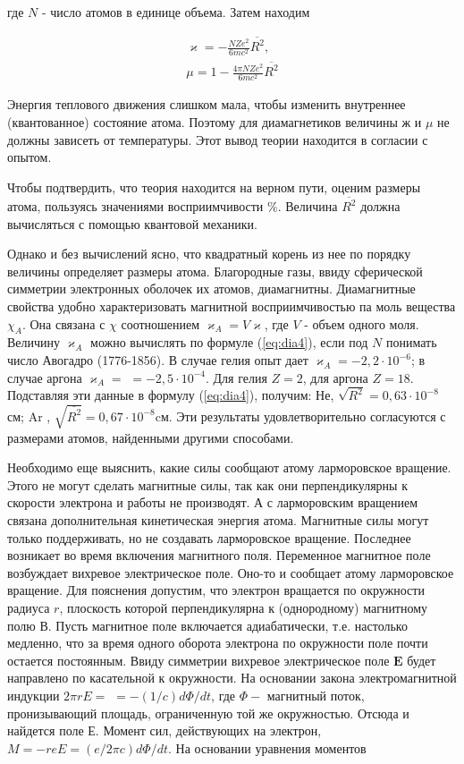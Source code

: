 \documentclass[12pt]{article}
\begin{document}
  где $N$ - число атомов в единице объема. Затем находим

  \begin{eqnarray}
  \varkappa=-\frac{N Z e^2}{6 m c^2} \overline{R^2}, \\
  \mu=1-\frac{4 \pi N Z e^2}{6 m c^2} \overline{R^2}
  \end{eqnarray}

  Энергия теплового движения слишком мала, чтобы изменить внутреннее (квантованное) состояние атома. Поэтому для диамагнетиков величины $ж$ и $\mu$ не должны зависеть от температуры. Этот вывод теории находится в согласии с опытом.

  Чтобы подтвердить, что теория находится на верном пути, оценим размеры атома, пользуясь значениями восприимчивости $\%$. Величина $\overline{R^2}$ должна вычисляться с помощью квантовой механики.

  Однако и без вычислений ясно, что квадратный корень из нее по порядку величины определяет размеры атома. Благородные газы, ввиду сферической симметрии электронных оболочек их атомов, диамагнитны. Диамагнитные свойства удобно характеризовать магнитной восприимчивостью па моль вещества $\chi_A$. Она связана с $\chi$ соотношением $\varkappa_A=V \varkappa$, где $V$ - объем одного моля. Величину $\varkappa_A$ можно вычислять по формуле (\ref{eq:dia4}), если под $N$ понимать число Авогадро (1776-1856). В случае гелия опыт дает $\varkappa_A=-2,2 \cdot 10^{-6}$; в случае аргона $\varkappa_A=$ $=-2,5 \cdot 10^{-4}$. Для гелия $Z=2$, для аргона $Z=18$. Подставляя
  эти данные в формулу (\ref{eq:dia4}), получим: Не, $\sqrt{R^2}=0,63 \cdot 10^{-8}$ см; Ar , $\sqrt{\overline{R^2}}=0,67 \cdot 10^{-8} \mathrm{cм}$. Эти результаты удовлетворительно согласуются с размерами атомов, найденными другими способами.

  Необходимо еще выяснить, какие силы сообщают атому ларморовское вращение. Этого не могут сделать магнитные силы, так как они перпендикулярны к скорости электрона и работы не производят. А с ларморовским вращением связана дополнительная кинетическая энергия атома. Магнитные силы могут только поддерживать, но не создавать ларморовское вращение. Последнее возникает во время включения магнитного поля. Переменное магнитное поле возбуждает вихревое электрическое поле. Оно-то и сообщает атому ларморовское
  вращение. Для пояснения допустим, что электрон вращается по окружности радиуса $r$, плоскость которой перпендикулярна к (однородному) магнитному полю В. Пусть магнитное поле включается адиабатически, т.е. настолько медленно, что за время одного оборота электрона по окружности поле почти остается постоянным. Ввиду симметрии вихревое электрическое поле $\mathbf{E}$ будет направлено по касательной к окружности. На основании закона электромагнитной индукции $2 \pi r E=$ $=-(1 / c) d \Phi / d t$, где $\Phi-$ магнитный поток, пронизывающий площадь, ограниченную той же окружностью. Отсюда и найдется поле Е. Момент сил, действующих на электрон, $M=-r e E=(e / 2 \pi c) d \Phi / d t$. На основании уравнения моментов
\end{document}
